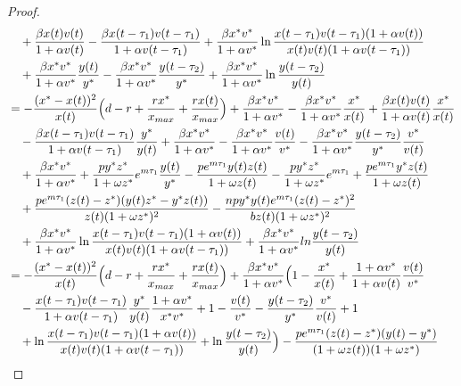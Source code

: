 \documentclass[10pt,a4paper]{amsart}
\numberwithin{equation}{section}
\begin{document}
\begin{proof}
\begin{align*}
&\quad +\frac{\beta x(t)v(t)}{1+\alpha v(t)}
 -\frac{\beta x(t-\tau_{1})v(t-\tau_{1})}{1+\alpha v(t-\tau_{1})}
 +\frac{\beta x^{*}v^{*}}{1+\alpha v^{*}}\ln\frac{x(t-\tau_{1})
  v(t-\tau_{1})(1+\alpha v(t))}{x(t)v(t)(1+\alpha v(t-\tau_{1}))}\\
&\quad +\frac{\beta x^{*}v^{*}}{1+\alpha v^{*}}\frac{y(t)}{y^{*}} 
 -\frac{\beta x^{*}v^{*}}{1+\alpha v^{*}}\frac{y(t-\tau_{2})}{y^{*}}
 +\frac{\beta x^{*}v^{*}}{1+\alpha v^{*}}\ln\frac{y(t-\tau_{2})}{y(t)}\\
&= -\frac{(x^{*}-x(t))^{2}}{x(t)}\Big(d-r+\frac{rx^{*}}{x_{\rm max}}
 +\frac{rx(t)}{x_{\rm max}}\Big)+\frac{\beta x^{*}v^{*}}{1+\alpha v^{*}}
 -\frac{\beta x^{*}v^{*}}{1+\alpha v^{*}}\frac{x^{*}}{x(t)}
 +\frac{\beta x(t)v(t)}{1+\alpha v(t)}\frac{x^{*}}{x(t)} \\
&\quad -\frac{\beta x(t-\tau_{1})v(t-\tau_{1})}{1+\alpha v(t-\tau_{1})}
 \frac{y^{*}}{y(t)}+\frac{\beta x^{*}v^{*}}{1+\alpha v^{*}}
-\frac{\beta x^{*}v^{*}}{1+\alpha v^{*}}\frac{v(t)}{v^{*}}
 -\frac{\beta x^{*}v^{*}}{1+\alpha v^{*}}\frac{y(t-\tau_{2})}{y^{*}}\frac{v^{*}}{v(t)} \\
&\quad +\frac{\beta x^{*}v^{*}}{1+\alpha v^{*}}
 +\frac{py^{*}z^{*}}{1+\omega z^{*}}e^{m\tau_1}\frac{y(t)}{y^{*}}
 -\frac{pe^{m\tau_{1}} y(t)z(t)}{1+\omega z(t)}
 -\frac{py^{*}z^{*}}{1+\omega z^{*}}e^{m\tau_1}
 +\frac{pe^{m\tau_{1}} y^{*}z(t)}{1+\omega z(t)} \\
&\quad +\frac{pe^{m\tau_1}(z(t)-z^{*})(y(t)z^{*}-y^{*}z(t))}{z(t)(1+\omega z^{*})^{2}}
 -\frac{npy^{*}y(t)e^{m\tau_1}(z(t)-z^{*})^{2}}{bz(t)(1+\omega z^{*})^{2}} \\
&\quad +\frac{\beta x^{*}v^{*}}{1+\alpha v^{*}}\ln\frac{x(t-\tau_{1})
 v(t-\tau_{1})(1+\alpha v(t))}{x(t)v(t)(1+\alpha v(t-\tau_{1}))}
 +\frac{\beta x^{*}v^{*}}{1+\alpha v^{*}}ln\frac{y(t-\tau_{2})}{y(t)} \\
&= -\frac{(x^{*}-x(t))^{2}}{x(t)}\Big(d-r+\frac{rx^{*}}{x_{\rm max}}
 +\frac{rx(t)}{x_{\rm max}}\Big)
 +\frac{\beta x^{*}v^{*}}{1+\alpha v^{*}}\Big(1-\frac{x^{*}}{x(t)}
 +\frac{1+\alpha v^{*}}{1+\alpha v(t)}\frac{v(t)}{v^{*}} \\
&\quad - \frac{ x(t-\tau_{1})v(t-\tau_{1})}{1+\alpha 
 v(t-\tau_{1})}\frac{y^{*}}{y(t)}\frac{1+\alpha v^{*}}{x^{*}v^{*}}+1-\frac{v(t)}{v^{*}}
 -\frac{y(t-\tau_{2})}{y^{*}}\frac{v^{*}}{v(t)}+1 \\
&\quad +\ln\frac{x(t-\tau_{1})v(t-\tau_{1})(1+\alpha v(t))}{x(t)v(t)(1+\alpha 
 v(t-\tau_{1}))}+\ln\frac{y(t-\tau_{2})}{y(t)}\Big)
 -\frac{pe^{m\tau_1}(z(t)-z^{*})(y(t)-y^{*})}{(1+\omega z(t))(1+\omega z^{*})} \\

\end{align*}
\end{proof}
\end{document}
